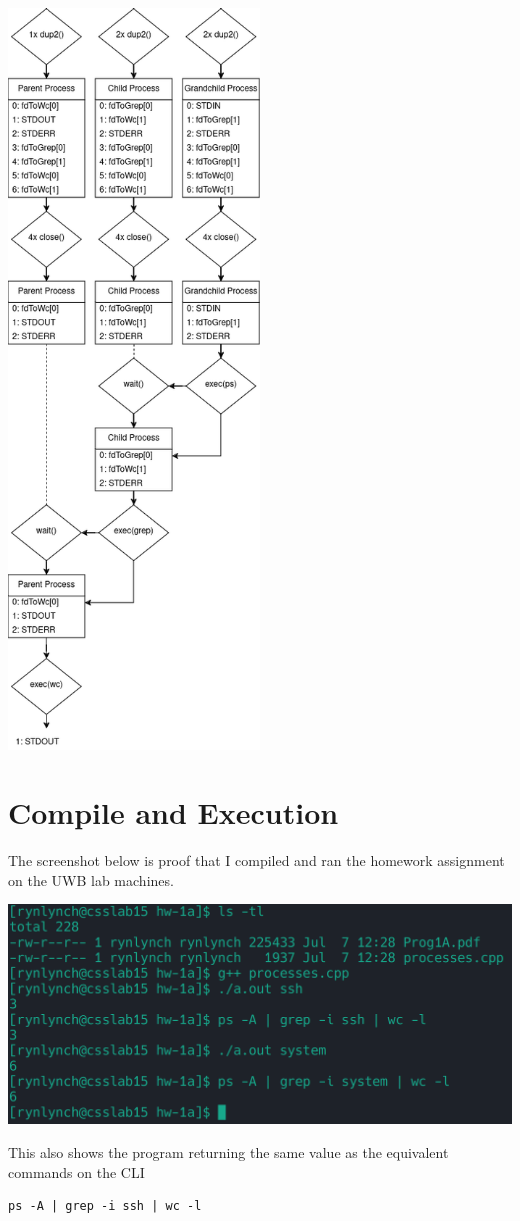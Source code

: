 \documentclass[a4paper,11pt,twoside]{article}
\begin{document}
\begin{multicols}{2}
\includegraphics[width=0.5\textwidth]{flow-diagram.drawio}
\end{multicols}
\section*{Compile and Execution}
\label{sec:orge5dcff9}
The screenshot below is proof that I compiled and ran the homework assignment on the UWB lab machines.
\begin{center}
\includegraphics[width=.9\linewidth]{./images/compile-and-execution.png}
\end{center}
This also shows the program returning the same value as the equivalent commands on the CLI
\begin{verbatim}
ps -A | grep -i ssh | wc -l
\end{verbatim}
\end{document}
